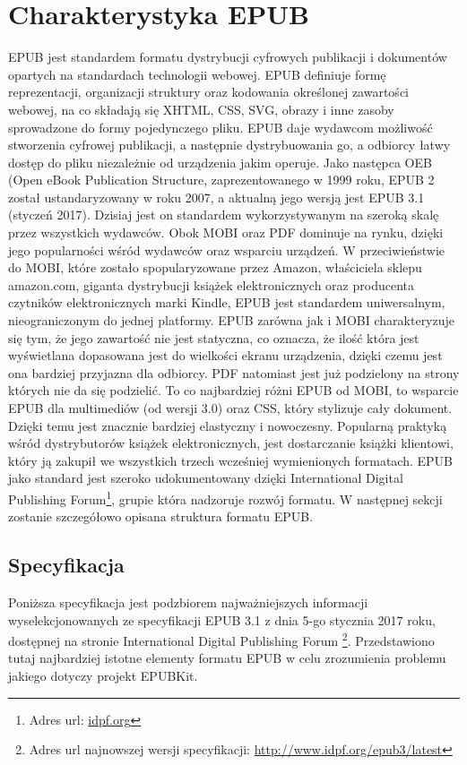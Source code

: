 \chapter{Charakterystyka EPUB}

EPUB jest standardem formatu dystrybucji cyfrowych publikacji i dokumentów opartych na standardach technologii webowej. EPUB definiuje formę reprezentacji, organizacji struktury oraz kodowania określonej zawartości webowej, na co składają się XHTML, CSS, SVG, obrazy i inne zasoby sprowadzone do formy pojedynczego pliku. EPUB daje wydawcom możliwość stworzenia cyfrowej publikacji, a następnie dystrybuowania go, a odbiorcy łatwy dostęp do pliku niezależnie od urządzenia jakim operuje. Jako następca OEB (Open eBook Publication Structure, zaprezentowanego w 1999 roku, EPUB 2 został ustandaryzowany w roku 2007, a aktualną jego wersją jest EPUB 3.1 (styczeń 2017). Dzisiaj jest on standardem wykorzystywanym na szeroką skalę przez wszystkich wydawców. Obok MOBI oraz PDF dominuje na rynku, dzięki jego popularności wśród wydawców oraz wsparciu urządzeń. W przeciwieństwie do MOBI, które zostało spopularyzowane przez Amazon, właściciela sklepu amazon.com, giganta dystrybucji książek elektronicznych oraz producenta czytników elektronicznych marki Kindle, EPUB jest standardem uniwersalnym, nieograniczonym do jednej platformy. EPUB zarówna jak i MOBI charakteryzuje się tym, że jego zawartość nie jest statyczna, co oznacza, że ilość która jest wyświetlana dopasowana jest do wielkości ekranu urządzenia, dzięki czemu jest ona bardziej przyjazna dla odbiorcy. PDF natomiast jest już podzielony na strony których nie da się podzielić. To co najbardziej różni EPUB od MOBI, to wsparcie EPUB dla multimediów (od wersji 3.0) oraz CSS, który stylizuje cały dokument. Dzięki temu jest znacznie bardziej elastyczny i nowoczesny. Popularną praktyką wśród dystrybutorów książek elektronicznych, jest dostarczanie książki klientowi, który ją zakupił we wszystkich trzech wcześniej wymienionych formatach. EPUB jako standard jest szeroko udokumentowany dzięki International Digital Publishing Forum\footnote{Adres url: \href{idpf.org}{idpf.org}}, grupie która nadzoruje rozwój formatu. W następnej sekcji zostanie szczegółowo opisana struktura formatu EPUB.

\section{Specyfikacja}

Poniższa specyfikacja jest podzbiorem najważniejszych informacji wyselekcjonowanych ze specyfikacji EPUB 3.1 z dnia 5-go stycznia 2017 roku, dostępnej na stronie International Digital Publishing Forum \footnote{Adres url najnowszej wersji specyfikacji: \href{http://www.idpf.org/epub3/latest}{http://www.idpf.org/epub3/latest}}. Przedstawiono tutaj najbardziej istotne elementy formatu EPUB w celu zrozumienia problemu jakiego dotyczy projekt EPUBKit.

